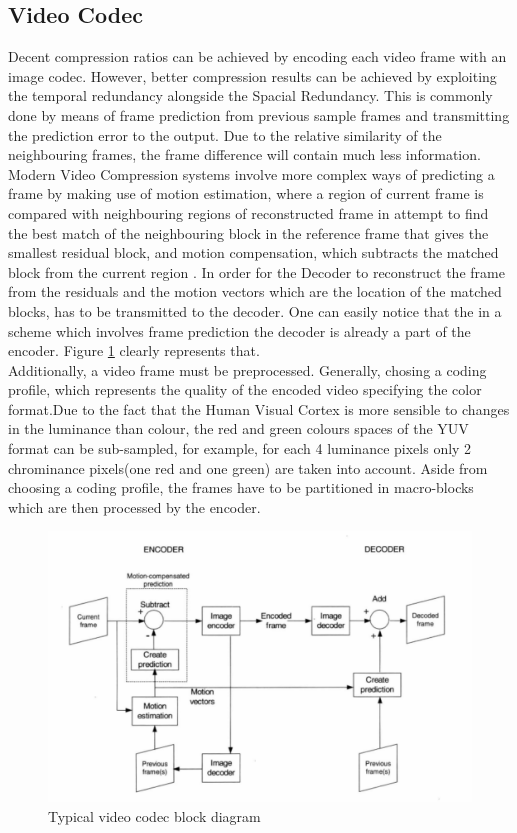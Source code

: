 \documentclass[a4paper,11pt,oneside]{article}
\begin{document}
\subsection{Video Codec}
\indent Decent compression ratios can be achieved by encoding each video frame with an image codec. However, better compression results can be achieved by exploiting the temporal redundancy alongside the Spacial Redundancy. This is commonly done by means of frame prediction from previous sample frames and transmitting the prediction error to the output. Due to the relative similarity of the neighbouring frames, the frame difference will contain much less information. Modern Video Compression systems involve more complex ways of predicting a frame by making use of motion estimation, where a region of current frame is compared with neighbouring regions of reconstructed frame in attempt to find the best match of the neighbouring block in the reference frame that gives the smallest residual block, and motion compensation, which subtracts the matched block from the current region \cite[p.~44]{richardson2002video}. In order for the Decoder to reconstruct the frame from the residuals and the motion vectors which are the location of the matched blocks, has to be transmitted to the decoder. One can easily notice that the in a scheme which involves frame prediction the decoder is already a part of the encoder. Figure \ref{figure:codec_block_diagram} clearly represents that. \\
Additionally, a video frame must be preprocessed. Generally, chosing a coding profile, which represents the quality of the encoded video specifying the color format.Due to the fact that the Human Visual Cortex is more sensible to changes in the luminance than colour, the red and green colours spaces of the YUV format can be sub-sampled, for example, for each 4 luminance pixels only 2 chrominance pixels(one red and one green) are taken into account. Aside from choosing  a coding profile, the frames have to be partitioned in macro-blocks which are then processed by the encoder. \\
\begin{figure}[h]
  \centering
  \includegraphics[width=\textwidth]{../figures/f1_codec_block_diagram.pdf}
  \caption{Typical video codec block diagram\cite[p.~44]{richardson2002video}}
  \label{figure:codec_block_diagram}
\end{figure} 
\end{document}
